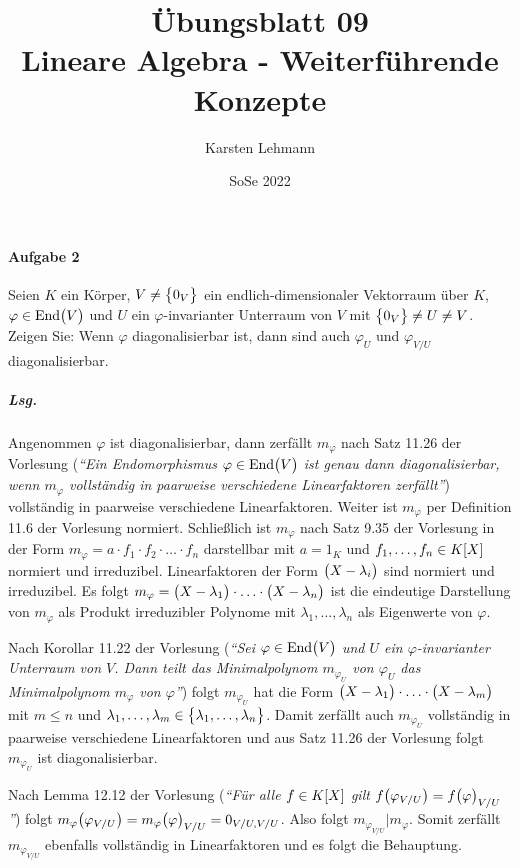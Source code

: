 \documentclass{scrreprt}
\author{Karsten Lehmann}
\date{SoSe 2022}
\title{Übungsblatt 09\\Lineare Algebra - Weiterführende Konzepte}
\newcommand\End{\text{End}}
\begin{document}
\paragraph{Aufgabe 2} Seien $K$ ein Körper, $V \ne \qty\big{0_V}$ ein
endlich-dimensionaler Vektorraum über $K$, $\varphi \in \End\qty\big(V)$
und $U$ ein $\varphi$-invarianter Unterraum von $V$ mit
$\qty\big{0_V} \ne U \ne V$.
Zeigen Sie: Wenn $\varphi$ diagonalisierbar ist, dann sind auch $\varphi_U$ und
$\varphi_{V/U}$ diagonalisierbar.

\subparagraph{Lsg.} Angenommen $\varphi$ ist diagonalisierbar, dann zerfällt
$m_{\varphi}$ nach Satz 11.26 der Vorlesung (\emph{``Ein Endomorphismus
  $\varphi \in \End\qty\big(V)$ ist genau dann diagonalisierbar, wenn
  $m_{\varphi}$ vollständig in paarweise verschiedene Linearfaktoren
  zerfällt''}) vollständig in paarweise verschiedene Linearfaktoren.
Weiter ist $m_{\varphi}$ per Definition 11.6 der Vorlesung normiert.
Schließlich ist $m_{\varphi}$ nach Satz 9.35 der Vorlesung in der Form
$m_{\varphi} = a \cdot f_1 \cdot f_2 \cdot \ldots \cdot f_n$ darstellbar mit
$a = 1_K$ und $f_1, \ldots, f_n \in K\qty[X]$ normiert und irreduzibel.
Linearfaktoren der Form $\qty\big(X - \lambda_i)$ sind normiert und irreduzibel.
Es folgt
$m_{\varphi} = \qty\big(X - \lambda_1)
\cdot \ldots \cdot \qty\big(X - \lambda_n)$
ist die eindeutige Darstellung von $m_{\varphi}$ als Produkt irreduzibler
Polynome mit $\lambda_1, \ldots, \lambda_n$ als Eigenwerte von $\varphi$.

Nach Korollar 11.22 der Vorlesung (\emph{``Sei $\varphi \in \End\qty\big(V)$ und
  $U$ ein $\varphi$-invarianter Unterraum von $V$.
  Dann teilt das Minimalpolynom $m_{\varphi_U}$ von $\varphi_U$ das
  Minimalpolynom $m_{\varphi}$ von $\varphi$''}) folgt $m_{\varphi_U}$ hat die
Form $\qty\big(X - \lambda_1) \cdot \ldots \cdot \qty\big(X - \lambda_m)$ mit
$m \leq n$ und $\lambda_1, \ldots, \lambda_m \in \qty\big{
  \lambda_1, \ldots, \lambda_n
}$.
Damit zerfällt auch $m_{\varphi_U}$ vollständig in paarweise verschiedene
Linearfaktoren und aus Satz 11.26 der Vorlesung folgt $m_{\varphi_U}$ ist
diagonalisierbar.

Nach Lemma 12.12 der Vorlesung (\emph{``Für alle $f \in K\qty[X]$ gilt
  $f\qty\big(\varphi_{V / U}) = f\qty\big(\varphi)_{V / U}$''}) folgt
$m_{\varphi}\qty\big(\varphi_{V / U}) = m_{\varphi}\qty\big(\varphi)_{V / U}
= 0_{V / U, V / U}$.
Also folgt $m_{\varphi_{V / U}} | m_{\varphi}$.
Somit zerfällt $m_{\varphi_{V / U}}$ ebenfalls vollständig in Linearfaktoren und
es folgt die Behauptung.
\end{document}
